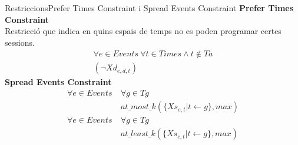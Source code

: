 \documentclass[11pt]{beamer}
\begin{document}
  \begin{frame}{Restriccions}{Prefer Times Constraint i Spread Events Constraint}
    \textbf{Prefer Times Constraint}\\
    Restricció que indica en quins espais de temps no es poden programar certes sessions.
    \begin{gather*}
      \forall e \in Events \ \forall t \in Times \land t \notin Ta \\ (\neg Xd_{e,d,t})
    \end{gather*}
    \textbf{Spread Events Constraint}\\
        \begin{align*}
          \forall e \in Events \ &\forall g \in Tg \\
          &at\_most\_k(\{Xs_{e,t} | t \leftarrow g\}, max)\\
          \forall e \in Events \ &\forall g \in Tg \\
          &at\_least\_k(\{Xs_{e,t} | t \leftarrow g\}, max)
        \end{align*}    
  \end{frame}
\end{document}
